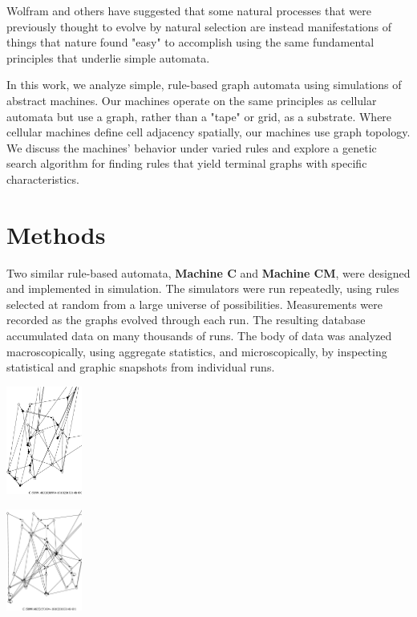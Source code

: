 \documentclass{tufte-handout}
\begin{document}
Wolfram and others have suggested that some natural processes that were
previously thought to evolve by natural selection are instead
manifestations of things that nature found "easy" to accomplish using
the same fundamental principles that underlie simple automata.

In this work, we analyze simple, rule-based graph automata using simulations of abstract
machines. Our machines operate on the same principles as
cellular automata but use a graph, rather than a "tape" or grid, as a substrate.
Where cellular machines define cell adjacency spatially, our machines use graph topology.
We discuss the machines' behavior under varied rules and explore a genetic search
algorithm for finding rules that yield terminal graphs with specific characteristics.


\section{Methods}

Two similar rule-based automata, \textbf{Machine C} and \textbf{Machine CM}, were designed
and implemented in simulation. The simulators were run repeatedly, using rules
selected at random from a large universe of possibilities. Measurements were recorded as the graphs
evolved through each run. The resulting database accumulated data on many thousands of runs. The body of data
was analyzed macroscopically, using aggregate statistics, and microscopically, by inspecting
statistical and graphic snapshots from individual runs.

\begin{marginfigure}
\hspace{3em}
\includegraphics[width=2.5cm]{evol2a_0.ps}
\end{marginfigure}

\begin{marginfigure}
\hspace{3em}
\includegraphics[width=2.5cm]{evol2a_1.ps}
\end{marginfigure}
\end{document}
